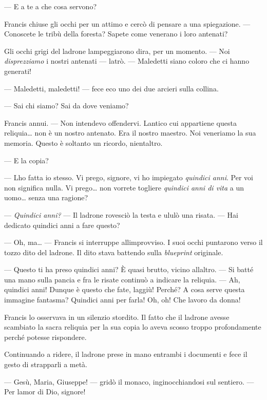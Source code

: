 --- E a te a che cosa servono?

Francis chiuse gli occhi per un attimo e cercò di pensare a una
spiegazione. --- Conoscete le tribù della foresta? Sapete come venerano
i loro antenati?

Gli occhi grigi del ladrone lampeggiarono d\textquotesingle ira, per un
momento. --- Noi \emph{disprezziamo} i nostri antenati --- latrò. ---
Maledetti siano coloro che ci hanno generati!

--- Maledetti, maledetti! --- fece eco uno dei due arcieri sulla
collina.

--- Sai chi siamo? Sai da dove veniamo?

Francis annui. --- Non intendevo offendervi. L\textquotesingle antico
cui appartiene questa reliquia\ldots{} non è un nostro antenato. Era il
nostro maestro. Noi veneriamo la sua memoria. Questo è soltanto un
ricordo, nient\textquotesingle altro.

--- E la copia?

--- L\textquotesingle ho fatta io stesso. Vi prego, signore, vi ho
impiegato \emph{quindici anni}. Per voi non significa nulla. Vi
prego\ldots{} non vorrete togliere \emph{quindici anni di vita} a un
uomo\ldots{} senza una ragione?

--- \emph{Quindici anni?} --- Il ladrone rovesciò la testa e ululò una
risata. --- Hai dedicato quindici anni a fare questo?

--- Oh, ma\ldots{} --- Francis si interruppe
all\textquotesingle improvviso. I suoi occhi puntarono verso il tozzo
dito del ladrone. Il dito stava battendo sulla \emph{blueprint}
originale.

--- Questo ti ha preso quindici anni? È quasi brutto, vicino
all\textquotesingle altro. --- Si batté una mano sulla pancia e fra le
risate continuò a indicare la reliquia. --- Ah, quindici anni! Dunque è
questo che fate, laggiù! Perché? A cosa serve questa immagine fantasma?
Quindici anni per farla! Oh, oh! Che lavoro da donna!

Francis lo osservava in un silenzio stordito. Il fatto che il ladrone
avesse scambiato la sacra reliquia per la sua copia lo aveva scosso
troppo profondamente perché potesse rispondere.

Continuando a ridere, il ladrone prese in mano entrambi i documenti e
fece il gesto di strapparli a metà.

--- Gesù, Maria, Giuseppe! --- gridò il monaco, inginocchiandosi sul
sentiero. --- Per l\textquotesingle amor di Dio, signore!

